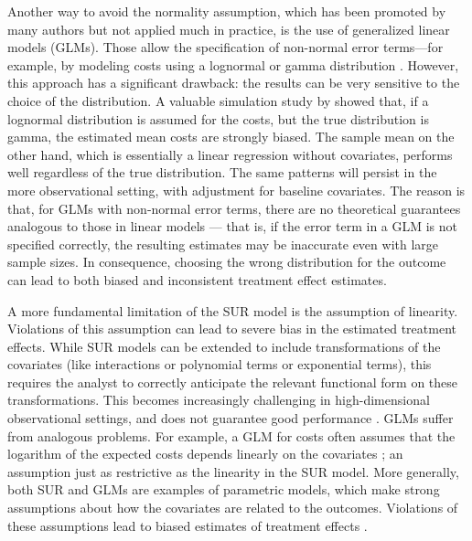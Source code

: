 \documentclass[aoas,preprint]{imsart}
\theoremstyle{plain}
\theoremstyle{definition}
\theoremstyle{remark}
\theoremstyle{remark}
\begin{document}
Another way to avoid the normality assumption, which has been promoted by many authors but not applied much in practice, is the use of generalized linear models (GLMs). Those allow the specification of non-normal error terms—for example, by modeling costs using a lognormal or gamma distribution \citep{baio2018statistical,gabrio2019bayesian}. However, this approach has a significant drawback: the results can be very sensitive to the choice of the distribution. A valuable simulation study by \citet{briggs2005parametric} showed that, if a lognormal distribution is assumed for the costs, but the true distribution is gamma, the estimated mean costs are strongly biased. The sample mean on the other hand, which is essentially a linear
regression without covariates, performs well regardless of the true distribution. The same patterns will persist in the more observational setting, with adjustment for baseline covariates. The reason is that, for GLMs with non-normal error terms, there are no theoretical guarantees analogous to those in linear models — that is, if the error term in a GLM is not specified correctly, the resulting estimates may be inaccurate even with large sample sizes. In consequence, choosing the wrong distribution for the outcome can lead to both biased and inconsistent treatment effect estimates.

A more fundamental limitation of the SUR model is the assumption of linearity. Violations of this assumption can lead to severe bias in the estimated treatment effects.
While SUR models can be extended to include transformations of the covariates (like interactions or polynomial terms or exponential terms), this requires the analyst to correctly anticipate the relevant functional form on these transformations. This becomes increasingly challenging in high-dimensional observational settings, and does not guarantee good performance \citep{dorie2019automated}. GLMs suffer from analogous problems. For example, a GLM for costs often assumes that the logarithm of the expected costs depends linearly on the covariates \citep{baio2018statistical}; an assumption just as restrictive as the linearity in the SUR model. More generally, both SUR and GLMs are examples of parametric models, which make strong assumptions about how the covariates are related to the outcomes. Violations of these assumptions lead to biased estimates of treatment effects \citep{dorie2019automated}. 
\end{document}
